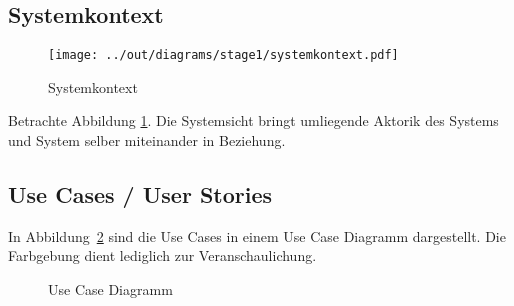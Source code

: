 \subsection{Systemkontext}\label{subsec:systemkontext2}

\begin{figure}
    \centering
    \texttt{[image: ../out/diagrams/stage1/systemkontext.pdf]}
    \caption{Systemkontext}
    \label{fig:systemkontext}
\end{figure}


Betrachte Abbildung \ref{fig:systemkontext}.
Die Systemsicht bringt umliegende Aktorik des Systems und System selber miteinander in Beziehung.


\subsection{Use Cases / User Stories}\label{subsec:use-cases-user-stories}

In Abbildung~\ref{fig:ucd} sind die Use Cases in einem Use Case Diagramm dargestellt.
Die Farbgebung dient lediglich zur Veranschaulichung.

\begin{figure}[h]
    \centering
    \caption{Use Case Diagramm}
    \label{fig:ucd}
\end{figure}
















